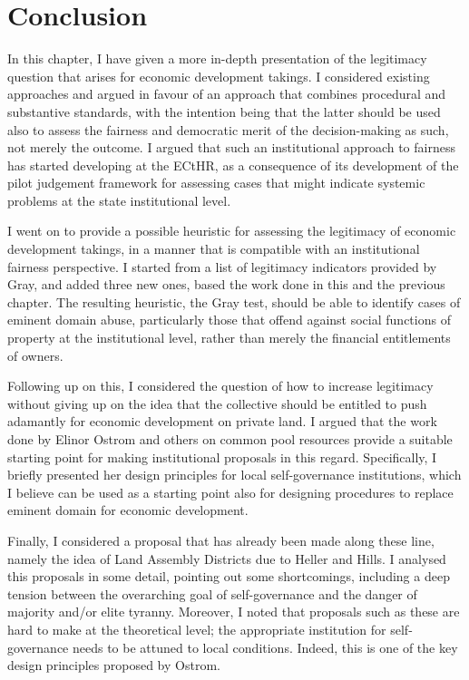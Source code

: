 \section{Conclusion}\label{sec:conc2}

In this chapter, I have given a more in-depth presentation of the legitimacy question that arises for economic development takings. I considered existing approaches and argued in favour of an approach that combines procedural and substantive standards, with the intention being that the latter should be used also to assess the fairness and democratic merit of the decision-making as such, not merely the outcome. I argued that such an institutional approach to fairness has started developing at the ECtHR, as a consequence of its development of the pilot judgement framework for assessing cases that might indicate systemic problems at the state institutional level.

I went on to provide a possible heuristic for assessing the legitimacy of economic development takings,  in a manner that is compatible with an institutional fairness perspective. I started from a list of legitimacy indicators provided by Gray, and added three new ones, based the work done in this and the previous chapter. The resulting heuristic, the Gray test, should be able to identify cases of eminent domain abuse, particularly those that offend against social functions of property at the institutional level, rather than merely the financial entitlements of owners.

Following up on this, I considered the question of how to increase legitimacy without giving up on the idea that the collective should be entitled to push adamantly for economic development on private land. I argued that the work done by Elinor Ostrom and others on common pool resources provide a suitable starting point for making institutional proposals in this regard. Specifically, I briefly presented her design principles for local self-governance institutions, which I believe can be used as a starting point also for designing procedures to replace eminent domain for economic development.

Finally, I considered a proposal that has already been made along these line, namely the idea of Land Assembly Districts due to Heller and Hills. I analysed this proposals in some detail, pointing out some shortcomings, including a deep tension between the overarching goal of self-governance and the danger of majority and/or elite tyranny. Moreover, I noted that proposals such as these are hard to make at the theoretical level; the appropriate institution for self-governance needs to be attuned to local conditions. Indeed, this is one of the key design principles proposed by Ostrom. 

